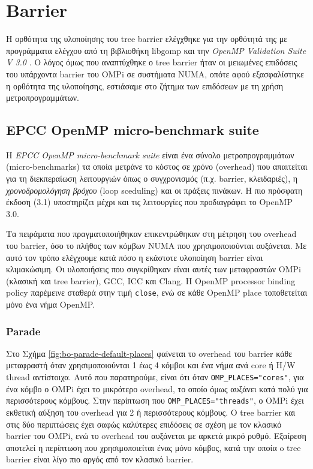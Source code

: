 \section{Barrier}
\label{sec:exp-barrier}
Η ορθότητα της υλοποίησης του tree barrier ελέγχθηκε για την ορθότητά της με προγράμματα ελέγχου από τη βιβλιοθήκη libgomp και την \textit{OpenMP Validation Suite V 3.0} \cite{wang2012openmp, ompvalsuite3}. Ο λόγος όμως που αναπτύχθηκε ο tree barrier ήταν οι μειωμένες επιδόσεις του υπάρχοντα barrier του OMPi σε συστήματα NUMA, οπότε αφού εξασφαλίστηκε η ορθότητα της υλοποίησης, εστιάσαμε στο ζήτημα των επιδόσεων με τη χρήση μετροπρογραμμάτων.

\subsection{EPCC OpenMP micro-benchmark suite}
Η \textit{EPCC OpenMP micro-benchmark suite} \cite{bull1999measuring} είναι ένα σύνολο μετροπρογραμμάτων (micro-benchmarks) τα οποία μετράνε το κόστος σε χρόνο (overhead) που απαιτείται για τη διεκπεραίωση λειτουργιών όπως ο συγχρονισμός (π.χ. barrier, κλειδαριές), η \textit{χρονοδρομολόγηση βρόχου} (loop sceduling) και οι πράξεις πινάκων. Η πιο πρόσφατη έκδοση (3.1) υποστηρίζει μέχρι και τις λειτουργίες που προδιαγράφει το OpenMP 3.0.

Τα πειράματα που πραγματοποιήθηκαν επικεντρώθηκαν στη μέτρηση του overhead του barrier, όσο το πλήθος των κόμβων NUMA που χρησιμοποιούνται αυξάνεται. Με αυτό τον τρόπο ελέγχουμε κατά πόσο η εκάστοτε υλοποίηση barrier είναι κλιμακώσιμη. Οι υλοποιήσεις που συγκρίθηκαν είναι αυτές των μεταφραστών OMPi (κλασική και tree barrier), GCC, ICC και Clang. Η OpenMP processor binding policy παρέμεινε σταθερά στην τιμή \texttt{close}, ενώ σε κάθε OpenMP place τοποθετείται μόνο ένα νήμα OpenMP.


\subsubsection{Parade}
Στο Σχήμα \ref{fig:bo-parade-default-places} φαίνεται το overhead του barrier κάθε μεταφραστή όταν χρησιμοποιούνται 1 έως 4 κόμβοι και ένα νήμα ανά core ή H/W thread αντίστοιχα. Αυτό που παρατηρούμε, είναι ότι όταν \texttt{OMP\_PLACES="cores"}, για ένα κόμβο ο OMPi έχει το μικρότερο overhead, το οποίο όμως αυξάνει κατά πολύ για περισσότερους κόμβους. Στην περίπτωση που \texttt{OMP\_PLACES="threads"}, ο OMPi έχει εκθετική αύξηση του overhead για 2 ή περισσότερους κόμβους. Ο tree barrier και στις δύο περιπτώσεις έχει σαφώς καλύτερες επιδόσεις σε σχέση με τον κλασικό barrier του OMPi, ενώ το overhead του αυξάνεται με αρκετά μικρό ρυθμό. Εξαίρεση αποτελεί η περίπτωση που χρησιμοποιείται ένας μόνο κόμβος, κατά την οποία o tree barrier είναι λίγο πιο αργός από τον κλασικό barrier. %

